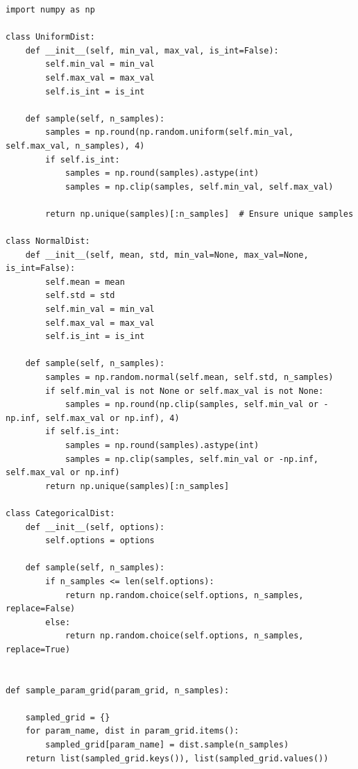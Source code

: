 \documentclass[journal]{IEEEtran}
\begin{document}
\begin{lstlisting}[style=python, caption={Random Variable Distribution Setup}, label={lst:distributions}]
import numpy as np

class UniformDist:
    def __init__(self, min_val, max_val, is_int=False):
        self.min_val = min_val
        self.max_val = max_val
        self.is_int = is_int

    def sample(self, n_samples):
        samples = np.round(np.random.uniform(self.min_val, self.max_val, n_samples), 4)
        if self.is_int:
            samples = np.round(samples).astype(int)
            samples = np.clip(samples, self.min_val, self.max_val)
            
        return np.unique(samples)[:n_samples]  # Ensure unique samples

class NormalDist:
    def __init__(self, mean, std, min_val=None, max_val=None, is_int=False):
        self.mean = mean
        self.std = std
        self.min_val = min_val
        self.max_val = max_val
        self.is_int = is_int

    def sample(self, n_samples):
        samples = np.random.normal(self.mean, self.std, n_samples)
        if self.min_val is not None or self.max_val is not None:
            samples = np.round(np.clip(samples, self.min_val or -np.inf, self.max_val or np.inf), 4)
        if self.is_int:
            samples = np.round(samples).astype(int)
            samples = np.clip(samples, self.min_val or -np.inf, self.max_val or np.inf)
        return np.unique(samples)[:n_samples]

class CategoricalDist:
    def __init__(self, options):
        self.options = options

    def sample(self, n_samples):
        if n_samples <= len(self.options):
            return np.random.choice(self.options, n_samples, replace=False)
        else:
            return np.random.choice(self.options, n_samples, replace=True)

    
def sample_param_grid(param_grid, n_samples):

    sampled_grid = {}
    for param_name, dist in param_grid.items():
        sampled_grid[param_name] = dist.sample(n_samples)
    return list(sampled_grid.keys()), list(sampled_grid.values())
\end{lstlisting}
\bigskip
\bigskip
\end{document}
